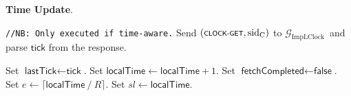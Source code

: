 \textbf{Time Update}.\label{apndx:update-time-protocol}
\begin{protocol}
    \caption{$\textsf{UpdateTime}(P, R)$}
    \begin{algorithmic}[1]
        \noindent
        \lstinline|//NB: Only executed if time-aware.|
        \State Send $(\textsf{\scriptsize{CLOCK-GET}}, \text{sid}_\text{C})$ to $\mathcal{G}_{\text{ImpLClock}}$\
        and parse $\textsf{tick}$ from the response.

            \State Set $\textsf{lastTick} \leftarrow \textsf{tick}$.
            \State Set $\textsf{localTime} \leftarrow \textsf{localTime} + 1$.
            \State Set $\textsf{fetchCompleted} \leftarrow \textsf{false}$.
        \EndIf
        \State Set $e \leftarrow \lceil \textsf{localTime} \mathbin{/} R \rceil$.
        \State Set $sl \leftarrow \textsf{localTime}$.
    \end{algorithmic}\label{alg:update-time-protocol}
\end{protocol}


